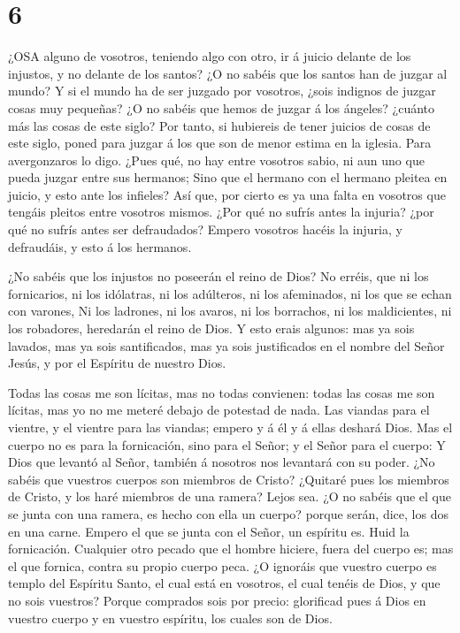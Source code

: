 \hypertarget{section-5}{%
\section{6}\label{section-5}}

 ¿OSA alguno de vosotros, teniendo algo con otro, ir á
juicio delante de los injustos, y no delante de los santos? 
¿O no sabéis que los santos han de juzgar al mundo? Y si el mundo ha de
ser juzgado por vosotros, ¿sois indignos de juzgar cosas muy pequeñas?
 ¿O no sabéis que hemos de juzgar á los ángeles? ¿cuánto más
las cosas de este siglo?  Por tanto, si hubiereis de tener
juicios de cosas de este siglo, poned para juzgar á los que son de menor
estima en la iglesia.  Para avergonzaros lo digo. ¿Pues qué,
no hay entre vosotros sabio, ni aun uno que pueda juzgar entre sus
hermanos;  Sino que el hermano con el hermano pleitea en
juicio, y esto ante los infieles?  Así que, por cierto es ya
una falta en vosotros que tengáis pleitos entre vosotros mismos. ¿Por
qué no sufrís antes la injuria? ¿por qué no sufrís antes ser
defraudados?  Empero vosotros hacéis la injuria, y
defraudáis, y esto á los hermanos.

 ¿No sabéis que los injustos no poseerán el reino de Dios?
No erréis, que ni los fornicarios, ni los idólatras, ni los adúlteros,
ni los afeminados, ni los que se echan con varones,  Ni los
ladrones, ni los avaros, ni los borrachos, ni los maldicientes, ni los
robadores, heredarán el reino de Dios.  Y esto erais
algunos: mas ya sois lavados, mas ya sois santificados, mas ya sois
justificados en el nombre del Señor Jesús, y por el Espíritu de nuestro
Dios.

 Todas las cosas me son lícitas, mas no todas convienen:
todas las cosas me son lícitas, mas yo no me meteré debajo de potestad
de nada.  Las viandas para el vientre, y el vientre para
las viandas; empero y á él y á ellas deshará Dios. Mas el cuerpo no es
para la fornicación, sino para el Señor; y el Señor para el cuerpo:
 Y Dios que levantó al Señor, también á nosotros nos
levantará con su poder.  ¿No sabéis que vuestros cuerpos
son miembros de Cristo? ¿Quitaré pues los miembros de Cristo, y los haré
miembros de una ramera? Lejos sea.  ¿O no sabéis que el que
se junta con una ramera, es hecho con ella un cuerpo? porque serán,
dice, los dos en una carne.  Empero el que se junta con el
Señor, un espíritu es.  Huid la fornicación. Cualquier otro
pecado que el hombre hiciere, fuera del cuerpo es; mas el que fornica,
contra su propio cuerpo peca.  ¿O ignoráis que vuestro
cuerpo es templo del Espíritu Santo, el cual está en vosotros, el cual
tenéis de Dios, y que no sois vuestros?  Porque comprados
sois por precio: glorificad pues á Dios en vuestro cuerpo y en vuestro
espíritu, los cuales son de Dios.

